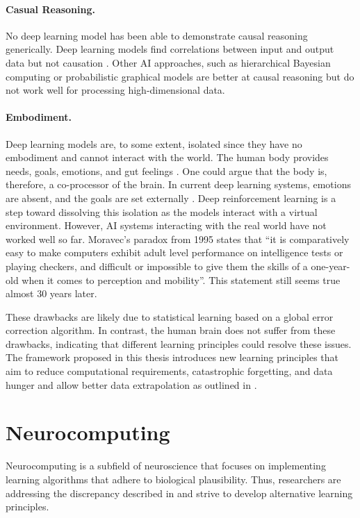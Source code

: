 \paragraph{Casual Reasoning.} No deep learning model has been able to demonstrate causal reasoning generically.
Deep learning models find correlations between input and output data but not causation .
Other AI approaches, such as hierarchical Bayesian computing  or probabilistic graphical models  are better at causal reasoning but do not work well for processing high-dimensional data.

\paragraph{Embodiment.} Deep learning models are, to some extent, isolated since they have no embodiment and cannot interact with the world.
The human body provides needs, goals, emotions, and gut feelings . One could argue that the body is, therefore, a co-processor of the brain.
In current deep learning systems, emotions are absent, and the goals are set externally .
Deep reinforcement learning \cite{dong_deep_2020} is a step toward dissolving this isolation as the models interact with a virtual environment. 
However, AI systems interacting with the real world have not worked well so far.
Moravec's paradox from 1995  states that ``it is comparatively easy to make computers exhibit adult level performance on intelligence tests or playing checkers, and difficult or impossible to give them the skills of a one-year-old when it comes to perception and mobility''.
This statement still seems true almost $30$ years later.

These drawbacks are likely due to statistical learning based on a global error correction algorithm.
In contrast, the human brain does not suffer from these drawbacks, indicating that different learning principles could resolve these issues.
The framework proposed in this thesis introduces new learning principles that aim to reduce computational requirements, catastrophic forgetting, and data hunger and allow better data extrapolation as outlined in .


\section{Neurocomputing}
Neurocomputing is a subfield of neuroscience that focuses on implementing learning algorithms that adhere to biological plausibility. Thus, researchers are addressing the discrepancy described in  and strive to develop alternative learning principles.

